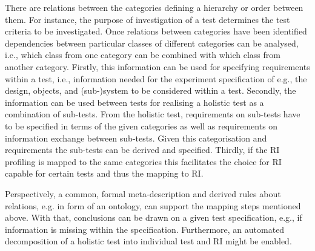 There are relations between the categories defining a hierarchy or order between them.
For instance, the purpose of investigation of a test determines the test criteria to be investigated. Once relations between categories have been identified dependencies between particular classes of different categories can be analysed, %
i.e., which class from one category can be combined with which class from another category.
Firstly, this information can be used for specifying requirements within a test, i.e., information needed for the experiment specification of e.g., the design, objects, and (sub-)system to be considered within a test.
Secondly, the information can be used between tests for realising a holistic test as a combination of sub-tests. From the holistic test, requirements on sub-tests have to be specified in terms of the given categories as well as requirements on information exchange between sub-tests.
Given this categorisation and requirements the sub-tests can be derived and specified.
Thirdly, if the RI profiling is mapped to the same categories this facilitates the choice for RI capable for certain tests and thus the mapping to RI.

Perspectively, a common, formal meta-description and derived rules about relations, e.g. in form of an ontology, can support the mapping steps mentioned above. With that, conclusions can be drawn on a given test specification, e.g., if information is missing within the specification.
Furthermore, an automated decomposition of a holistic test into individual test and RI might be enabled.